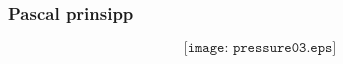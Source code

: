 \documentclass[aspectratio=169,xcolor=dvipsnames]{beamer}
\begin{document}
%
\begin{frame}
	\frametitle{Pascal prinsipp}

	$$\texttt{[image: pressure03.eps]}$$
\end{frame}
%
%
%
%
%
%
\end{document}
